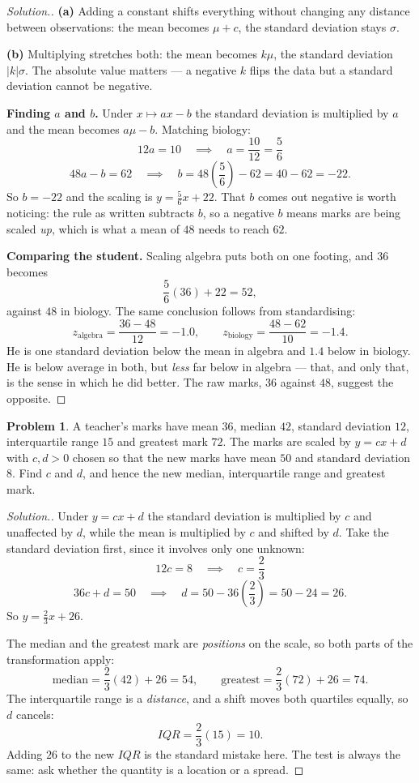 \documentclass[11pt,a4paper]{article}
\theoremstyle{definition}
\newtheorem{problemx}{Problem}[section]
\newenvironment{problem}{\begin{problemx}}{\end{problemx}}
\newenvironment{solution}
  {\renewcommand{\qedsymbol}{}\begin{proof}[\textit{Solution}.]}
  {\end{proof}}
\begin{document}
\begin{solution}
\textbf{(a)} Adding a constant shifts everything without changing any distance between
observations: the mean becomes $\mu+c$, the standard deviation stays $\sigma$.

\textbf{(b)} Multiplying stretches both: the mean becomes $k\mu$, the standard deviation
$|k|\sigma$. The absolute value matters --- a negative $k$ flips the data but a standard
deviation cannot be negative.

\textbf{Finding $a$ and $b$.} Under $x\mapsto ax-b$ the standard deviation is multiplied by
$a$ and the mean becomes $a\mu-b$. Matching biology:
\[12a=10\quad\implies\quad a=\frac{10}{12}=\frac{5}{6}\]
\[48a-b=62\quad\implies\quad b=48\left(\frac{5}{6}\right)-62=40-62=-22.\]
So $b=-22$ and the scaling is $y=\frac{5}{6}x+22$. That $b$ comes out negative is worth
noticing: the rule as written subtracts $b$, so a negative $b$ means marks are being scaled
\emph{up}, which is what a mean of $48$ needs to reach $62$.

\textbf{Comparing the student.} Scaling algebra puts both on one footing, and $36$ becomes
\[\frac{5}{6}(36)+22=52,\]
against $48$ in biology. The same conclusion follows from standardising:
\[z_{\text{algebra}}=\frac{36-48}{12}=-1.0,\qquad z_{\text{biology}}=\frac{48-62}{10}=-1.4.\]
He is one standard deviation below the mean in algebra and $1.4$ below in biology. He is
below average in both, but \emph{less} far below in algebra --- that, and only that, is the
sense in which he did better. The raw marks, $36$ against $48$, suggest the opposite.
\end{solution}

\begin{problem}
A teacher's marks have mean $36$, median $42$, standard deviation $12$, interquartile range
$15$ and greatest mark $72$. The marks are scaled by $y=cx+d$ with $c,d>0$ chosen so that
the new marks have mean $50$ and standard deviation $8$. Find $c$ and $d$, and hence the new
median, interquartile range and greatest mark.
\end{problem}

\begin{solution}
Under $y=cx+d$ the standard deviation is multiplied by $c$ and unaffected by $d$, while the
mean is multiplied by $c$ and shifted by $d$. Take the standard deviation first, since it
involves only one unknown:
\[12c=8\quad\implies\quad c=\frac{2}{3}\]
\[36c+d=50\quad\implies\quad d=50-36\left(\frac{2}{3}\right)=50-24=26.\]
So $y=\frac{2}{3}x+26$.

The median and the greatest mark are \emph{positions} on the scale, so both parts of the
transformation apply:
\[\text{median}=\frac{2}{3}(42)+26=54,\qquad \text{greatest}=\frac{2}{3}(72)+26=74.\]
The interquartile range is a \emph{distance}, and a shift moves both quartiles equally, so
$d$ cancels:
\[IQR=\frac{2}{3}(15)=10.\]
Adding $26$ to the new $IQR$ is the standard mistake here. The test is always the same: ask
whether the quantity is a location or a spread.
\end{solution}
\end{document}
